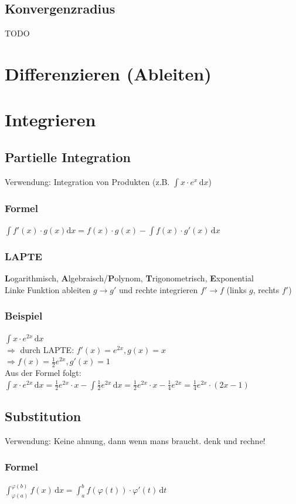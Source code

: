 \documentclass[a4paper,portrait]{scrartcl}
\begin{document}
\subsection{Konvergenzradius}
TODO
\section{Differenzieren (Ableiten)}

\section{Integrieren}
\subsection{Partielle Integration}
Verwendung: Integration von Produkten (z.B. $ \int \! x \cdot e^x \, \mathrm{d}x $)
\subsubsection*{Formel}
$ \int f'(x) \cdot g(x) \mathrm{d}x = f(x) \cdot g(x) - \int f(x) \cdot g'(x) \, \mathrm{d}x$
\subsubsection*{LAPTE}
\textbf{L}ogarithmisch, \textbf{A}lgebraisch/\textbf{P}olynom, \textbf{T}rigonometrisch, \textbf{E}xponential \\
Linke Funktion ableiten $g \rightarrow g'$ und rechte integrieren $f'\rightarrow f$ (links $g$, rechts $f'$)
\subsubsection*{Beispiel}
$ \int \! x \cdot e^{2x} \, \mathrm{d}x$ \\
$\Rightarrow$ durch LAPTE: $f'(x) = e^{2x}, g(x) = x$ \\
$\Rightarrow f(x) = \frac{1}{2} e^{2x}, g'(x) = 1 $  \\
Aus der Formel folgt: 
$ \int \! x \cdot e^{2x} \, \mathrm{d}x = \frac{1}{2} e^{2x} \cdot x - \int \! \frac{1}{2} e^{2x} \, \mathrm{d}x = \frac{1}{2} e^{2x} \cdot x - \frac{1}{4} e^{2x} = \frac{1}{4} e^{2x} \cdot (2x-1)$
\subsection{Substitution}
Verwendung: Keine ahnung, dann wenn mans braucht. denk und rechne!
\subsubsection*{Formel}
$ \int_{\varphi(a)}^{\varphi(b)} \! f(x) \,\mathrm{d}x = \int_{a}^{b} \! f(\varphi(t)) \cdot \varphi'(t) \,\mathrm{d}t$
\end{document}

